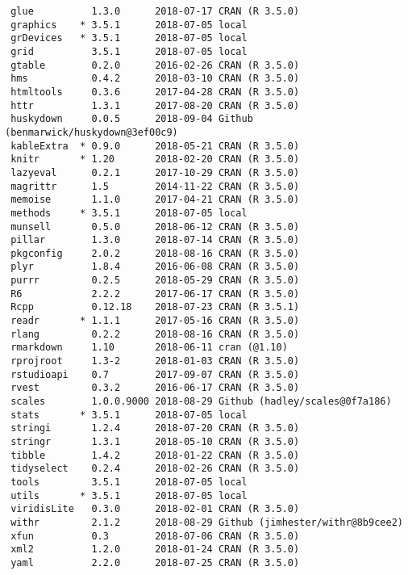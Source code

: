 \documentclass[twoside,12pt,final]{ucthesis-CA2012} %
\begin{document}
\begin{ucmainmatter}
\begin{verbatim}
 glue          1.3.0      2018-07-17 CRAN (R 3.5.0)                       
 graphics    * 3.5.1      2018-07-05 local                                
 grDevices   * 3.5.1      2018-07-05 local                                
 grid          3.5.1      2018-07-05 local                                
 gtable        0.2.0      2016-02-26 CRAN (R 3.5.0)                       
 hms           0.4.2      2018-03-10 CRAN (R 3.5.0)                       
 htmltools     0.3.6      2017-04-28 CRAN (R 3.5.0)                       
 httr          1.3.1      2017-08-20 CRAN (R 3.5.0)                       
 huskydown     0.0.5      2018-09-04 Github (benmarwick/huskydown@3ef00c9)
 kableExtra  * 0.9.0      2018-05-21 CRAN (R 3.5.0)                       
 knitr       * 1.20       2018-02-20 CRAN (R 3.5.0)                       
 lazyeval      0.2.1      2017-10-29 CRAN (R 3.5.0)                       
 magrittr      1.5        2014-11-22 CRAN (R 3.5.0)                       
 memoise       1.1.0      2017-04-21 CRAN (R 3.5.0)                       
 methods     * 3.5.1      2018-07-05 local                                
 munsell       0.5.0      2018-06-12 CRAN (R 3.5.0)                       
 pillar        1.3.0      2018-07-14 CRAN (R 3.5.0)                       
 pkgconfig     2.0.2      2018-08-16 CRAN (R 3.5.0)                       
 plyr          1.8.4      2016-06-08 CRAN (R 3.5.0)                       
 purrr         0.2.5      2018-05-29 CRAN (R 3.5.0)                       
 R6            2.2.2      2017-06-17 CRAN (R 3.5.0)                       
 Rcpp          0.12.18    2018-07-23 CRAN (R 3.5.1)                       
 readr       * 1.1.1      2017-05-16 CRAN (R 3.5.0)                       
 rlang         0.2.2      2018-08-16 CRAN (R 3.5.0)                       
 rmarkdown     1.10       2018-06-11 cran (@1.10)                         
 rprojroot     1.3-2      2018-01-03 CRAN (R 3.5.0)                       
 rstudioapi    0.7        2017-09-07 CRAN (R 3.5.0)                       
 rvest         0.3.2      2016-06-17 CRAN (R 3.5.0)                       
 scales        1.0.0.9000 2018-08-29 Github (hadley/scales@0f7a186)       
 stats       * 3.5.1      2018-07-05 local                                
 stringi       1.2.4      2018-07-20 CRAN (R 3.5.0)                       
 stringr       1.3.1      2018-05-10 CRAN (R 3.5.0)                       
 tibble        1.4.2      2018-01-22 CRAN (R 3.5.0)                       
 tidyselect    0.2.4      2018-02-26 CRAN (R 3.5.0)                       
 tools         3.5.1      2018-07-05 local                                
 utils       * 3.5.1      2018-07-05 local                                
 viridisLite   0.3.0      2018-02-01 CRAN (R 3.5.0)                       
 withr         2.1.2      2018-08-29 Github (jimhester/withr@8b9cee2)     
 xfun          0.3        2018-07-06 CRAN (R 3.5.0)                       
 xml2          1.2.0      2018-01-24 CRAN (R 3.5.0)                       
 yaml          2.2.0      2018-07-25 CRAN (R 3.5.0)                       
\end{verbatim}
\hypertarget{references}{%
}
\end{ucmainmatter}
\end{document}
